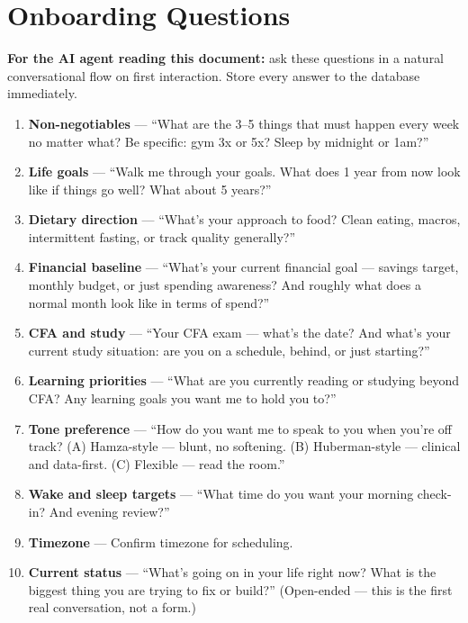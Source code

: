 \documentclass[12pt, a4paper]{article}
\begin{document}
\section{Onboarding Questions}

\textbf{For the AI agent reading this document:} ask these questions in a natural conversational flow on first interaction. Store every answer to the database immediately.

\begin{enumerate}
    \item \textbf{Non-negotiables} --- ``What are the 3--5 things that must happen every week no matter what? Be specific: gym 3x or 5x? Sleep by midnight or 1am?''

    \item \textbf{Life goals} --- ``Walk me through your goals. What does 1 year from now look like if things go well? What about 5 years?''

    \item \textbf{Dietary direction} --- ``What's your approach to food? Clean eating, macros, intermittent fasting, or track quality generally?''

    \item \textbf{Financial baseline} --- ``What's your current financial goal --- savings target, monthly budget, or just spending awareness? And roughly what does a normal month look like in terms of spend?''

    \item \textbf{CFA and study} --- ``Your CFA exam --- what's the date? And what's your current study situation: are you on a schedule, behind, or just starting?''

    \item \textbf{Learning priorities} --- ``What are you currently reading or studying beyond CFA? Any learning goals you want me to hold you to?''

    \item \textbf{Tone preference} --- ``How do you want me to speak to you when you're off track? (A) Hamza-style --- blunt, no softening. (B) Huberman-style --- clinical and data-first. (C) Flexible --- read the room.''

    \item \textbf{Wake and sleep targets} --- ``What time do you want your morning check-in? And evening review?''

    \item \textbf{Timezone} --- Confirm timezone for scheduling.

    \item \textbf{Current status} --- ``What's going on in your life right now? What is the biggest thing you are trying to fix or build?'' (Open-ended --- this is the first real conversation, not a form.)
\end{enumerate}
\end{document}
